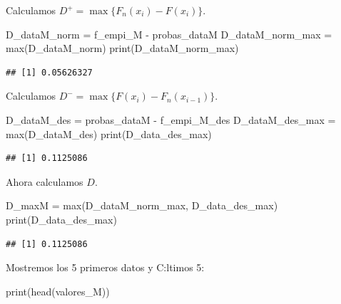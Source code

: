 \documentclass[
]{article}
\newenvironment{Shaded}{\begin{snugshade}}{\end{snugshade}}
\newcommand{\FunctionTok}[1]{\textcolor[rgb]{0.00,0.00,0.00}{#1}}
\newcommand{\NormalTok}[1]{#1}
\newcommand{\OtherTok}[1]{\textcolor[rgb]{0.56,0.35,0.01}{#1}}
\newcommand{\SpecialCharTok}[1]{\textcolor[rgb]{0.00,0.00,0.00}{#1}}
\begin{document}
Calculamos \(D^{+}=\max \{F_{n}(x_{i}) - F(x_{i}) \}\).

\begin{Shaded}
\begin{Highlighting}[]
\NormalTok{D\_dataM\_norm }\OtherTok{=}\NormalTok{ f\_empi\_M }\SpecialCharTok{{-}}\NormalTok{ probas\_dataM}
\NormalTok{D\_dataM\_norm\_max }\OtherTok{=} \FunctionTok{max}\NormalTok{(D\_dataM\_norm)}
\FunctionTok{print}\NormalTok{(D\_dataM\_norm\_max)}
\end{Highlighting}
\end{Shaded}

\begin{verbatim}
## [1] 0.05626327
\end{verbatim}

Calculamos \(D^{-}=\max \{F(x_{i}) - F_{n}(x_{i-1}) \}\).

\begin{Shaded}
\begin{Highlighting}[]
\NormalTok{D\_dataM\_des }\OtherTok{=}\NormalTok{ probas\_dataM }\SpecialCharTok{{-}}\NormalTok{ f\_empi\_M\_des}
\NormalTok{D\_dataM\_des\_max }\OtherTok{=} \FunctionTok{max}\NormalTok{(D\_dataM\_des)}
\FunctionTok{print}\NormalTok{(D\_data\_des\_max)}
\end{Highlighting}
\end{Shaded}

\begin{verbatim}
## [1] 0.1125086
\end{verbatim}

Ahora calculamos \(D\).

\begin{Shaded}
\begin{Highlighting}[]
\NormalTok{D\_maxM }\OtherTok{=} \FunctionTok{max}\NormalTok{(D\_dataM\_norm\_max, D\_data\_des\_max)}
\FunctionTok{print}\NormalTok{(D\_data\_des\_max)}
\end{Highlighting}
\end{Shaded}

\begin{verbatim}
## [1] 0.1125086
\end{verbatim}

Mostremos los 5 primeros datos y C:ltimos 5:

\begin{Shaded}
\begin{Highlighting}[]
\FunctionTok{print}\NormalTok{(}\FunctionTok{head}\NormalTok{(valores\_M))}
\end{Highlighting}
\end{Shaded}
\end{document}
